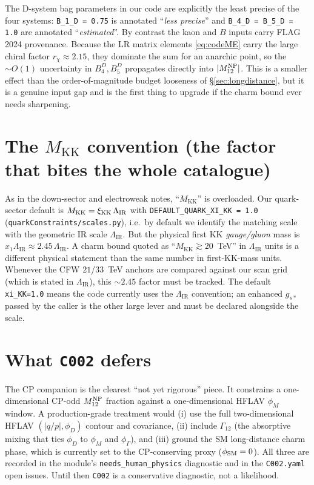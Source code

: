 \documentclass[11pt]{article}
\newcommand{\MKK}{M_{\mathrm{KK}}}
\newcommand{\LIR}{\Lambda_{\mathrm{IR}}}
\newcommand{\code}[1]{\texttt{#1}}
\newcommand{\Mtwelve}{M_{12}}
\theoremstyle{definition}
\begin{document}
The D-system bag parameters in our code are explicitly the least precise of the
four systems: \code{B\_1\_D = 0.75} is annotated ``\emph{less precise}'' and
\code{B\_4\_D = B\_5\_D = 1.0} are annotated ``\emph{estimated}''. By contrast
the kaon and $B$ inputs carry FLAG 2024 provenance. Because the LR matrix
elements \eqref{eq:codeME} carry the large chiral factor $r_\chi\approx2.15$,
they dominate the sum for an anarchic point, so the $\sim O(1)$ uncertainty in
$B_4^D,B_5^D$ propagates directly into $|\Mtwelve^{\rm NP}|$. This is a smaller
effect than the order-of-magnitude budget looseness of \S\ref{sec:longdistance},
but it is a genuine input gap and is the first thing to upgrade if the charm
bound ever needs sharpening.

\section{The $\MKK$ convention (the factor that bites the whole catalogue)}
\label{sec:convention}

As in the down-sector and electroweak notes, ``$\MKK$'' is overloaded. Our
quark-sector default is $\MKK = \xi_{\rm KK}\,\LIR$ with
\code{DEFAULT\_QUARK\_XI\_KK = 1.0} (\code{quarkConstraints/scales.py}), i.e.\ by
default we identify the matching scale with the geometric IR scale $\LIR$. But
the physical first KK \emph{gauge/gluon} mass is $x_1\LIR\approx2.45\,\LIR$. A
charm bound quoted as ``$\MKK\gtrsim20$~TeV'' in $\LIR$ units is a different
physical statement than the same number in first-KK-mass units. Whenever the
CFW $21$/$33$~TeV anchors are compared against our scan grid (which is stated in
$\LIR$), this $\sim2.45$ factor must be tracked. The default
\code{xi\_KK=1.0} means the code currently uses the $\LIR$ convention; an
enhanced $g_{s*}$ passed by the caller is the other large lever and must be
declared alongside the scale.

\section{What \code{C002} defers}
\label{sec:c002defer}

The CP companion is the clearest ``not yet rigorous'' piece. It constrains a
one-dimensional CP-odd $\Mtwelve^{\rm NP}$ fraction against a one-dimensional
HFLAV $\phi_M$ window. A production-grade treatment would (i) use the full
two-dimensional HFLAV $(|q/p|,\phi_D)$ contour and covariance, (ii) include
$\Gamma_{12}$ (the absorptive mixing that ties $\phi_D$ to $\phi_M$ and
$\phi_\Gamma$), and (iii) ground the SM long-distance charm phase, which is
currently set to the CP-conserving proxy ($\phi_{\rm SM}=0$). All three are
recorded in the module's \code{needs\_human\_physics} diagnostic and in the
\code{C002.yaml} open issues. Until then \code{C002} is a conservative
diagnostic, not a likelihood.
\end{document}
